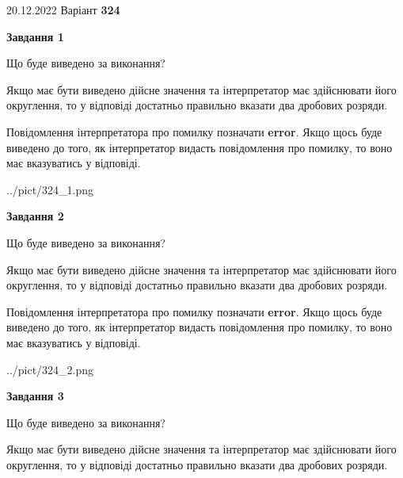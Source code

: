 \documentclass[12pt, ukrainian]{article}
\begin{document}
{20.12.2022 Варіант \No \textbf { 324 }\par}
{
\begin {Large}

{\begin {center}\textbf{Завдання 1}\end {center}}\par
Що буде виведено за виконання? \par

Якщо має бути виведено дійсне значення та інтерпретатор має здійснювати його округлення, 
то у відповіді достатньо правильно вказати два дробових розряди.

Повідомлення інтерпретатора про помилку позначати \textbf{error}.
Якщо щось буде виведено до того, як інтерпретатор видасть повідомлення про помилку, 
то воно має вказуватись у відповіді. \par

\begin{center}
	{../pict/324_1.png}
\end{center}
\newpage

{\begin {center}\textbf{Завдання 2}\end {center}}\par
Що буде виведено за виконання? \par

Якщо має бути виведено дійсне значення та інтерпретатор має здійснювати його округлення, 
то у відповіді достатньо правильно вказати два дробових розряди.

Повідомлення інтерпретатора про помилку позначати \textbf{error}.
Якщо щось буде виведено до того, як інтерпретатор видасть повідомлення про помилку, 
то воно має вказуватись у відповіді. \par

\begin{center}
	{../pict/324_2.png}
\end{center}
\newpage

{\begin {center}\textbf{Завдання 3}\end {center}}\par
Що буде виведено за виконання? \par

Якщо має бути виведено дійсне значення та інтерпретатор має здійснювати його округлення, 
то у відповіді достатньо правильно вказати два дробових розряди.


\end{Large}}
\end{document}
